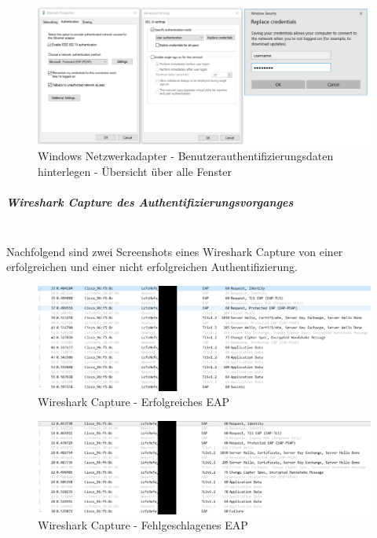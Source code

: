 \begin{figure}[H]
	\centering
	\includegraphics[width=15cm]{img/8021x/8021x_2.png}
	\caption{Windows Netzwerkadapter - Benutzerauthentifizierungsdaten hinterlegen - Übersicht über alle Fenster}
	\label{fig:windows-8021x-userauth}
\end{figure}

\subparagraph{Wireshark Capture des Authentifizierungsvorganges}
~\\
Nachfolgend sind zwei Screenshots eines Wireshark Capture von einer erfolgreichen und einer nicht erfolgreichen Authentifizierung. 

\begin{figure}[H]
	\centering
	\includegraphics[width=15cm]{img/8021x/userauth-success.png}
	\caption{Wireshark Capture - Erfolgreiches EAP}
	\label{fig:windows-8021x-userauth-success}
\end{figure}

\begin{figure}[H]
	\centering
	\includegraphics[width=15cm]{img/8021x/userauth-fail.PNG}
	\caption{Wireshark Capture - Fehlgeschlagenes EAP}
	\label{fig:windows-8021x-userauth-fail}
\end{figure}

